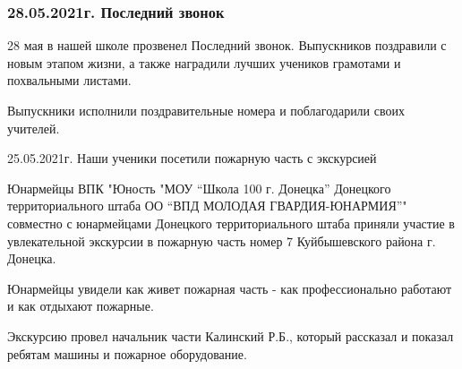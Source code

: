\subsubsection{28.05.2021г. Последний звонок}

28 мая в нашей школе прозвенел Последний звонок. Выпускников поздравили с новым
этапом жизни, а также наградили лучших учеников грамотами и похвальными
листами. 

Выпускники исполнили поздравительные номера и поблагодарили своих учителей.


25.05.2021г.  Наши ученики посетили пожарную часть с экскурсией

Юнармейцы ВПК "Юность "МОУ \enquote{Школа 100 г. Донецка} Донецкого территориального
штаба ОО \enquote{ВПД МОЛОДАЯ ГВАРДИЯ-ЮНАРМИЯ}" совместно с юнармейцами Донецкого
территориального штаба приняли участие в увлекательной экскурсии в пожарную
часть номер 7 Куйбышевского района г. Донецка.

Юнармейцы увидели как живет пожарная часть - как профессионально работают и как
отдыхают пожарные.

Экскурсию провел начальник части Калинский Р.Б., который  рассказал и показал
ребятам машины и пожарное оборудование. 
